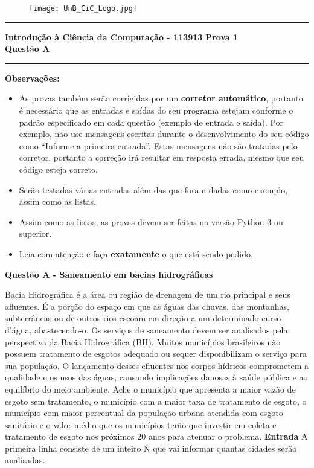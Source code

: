 \documentclass[a4paper, 12pt]{article}
\begin{document}
\begin{figure}[H]
	\texttt{[image: UnB\_CiC\_Logo.jpg]}
\end{figure}
\noindent\rule{\textwidth}{0.4pt}
\begin{center}
	\textbf{{\Large Introdução à Ciência da Computação - 113913}} \newline \newline
	\textbf{{\large Prova 1} \\
	\vspace{9pt}
	{\large Questão A}} \\
	\noindent\rule{\textwidth}{0.4pt}
	\newline
\end{center}

\textbf{{\large Observações:}}
\begin{itemize}
	\item As provas também serão corrigidas por um \textbf{corretor automático}, portanto é necessário que as entradas e saídas do seu programa estejam conforme o padrão especificado em cada questão (exemplo de entrada e saída). Por exemplo, não use mensagens escritas durante o desenvolvimento do seu código como “Informe a primeira entrada”. Estas mensagens não são tratadas pelo corretor, portanto a correção irá resultar em resposta errada, mesmo que seu código esteja correto.
	\item Serão testadas várias entradas além das que foram dadas como exemplo, assim como as listas.
	\item Assim como as listas, as provas devem ser feitas na versão Python 3 ou superior.
	\item Leia com atenção e faça \textbf{exatamente} o que está sendo pedido.
\end{itemize}
\newpage %
\begin{center}
\textbf{{\Large Questão A - Saneamento em bacias hidrográficas}}
\end{center}
\vspace{5pt}

Bacia Hidrográfica é a área ou região de drenagem de um rio principal e seus afluentes. É a porção do espaço em que as águas das chuvas, das montanhas, subterrâneas ou de outros rios escoam em direção a um determinado curso d’água, abastecendo-o. Os serviços de saneamento devem ser analisados pela perspectiva da Bacia Hidrográfica (BH).  Muitos municípios brasileiros não possuem tratamento de esgotos adequado ou sequer disponibilizam o serviço para sua população. O lançamento desses efluentes nos corpos hídricos comprometem a qualidade e os usos das águas, causando implicações danosas à saúde pública e ao equilíbrio do meio ambiente. Ache o município que apresenta a maior vazão de esgoto sem tratamento, o município com a maior taxa de tratamento de esgoto, o município com maior percentual da população urbana atendida com esgoto sanitário e o valor médio que os municípios terão que investir em coleta e tratamento de esgoto nos próximos 20 anos para atenuar o problema. 
\newline \newline
\textbf{{\large Entrada}} \newline
A primeira linha consiste de um inteiro N que vai informar quantas cidades serão analisadas.
\end{document}

